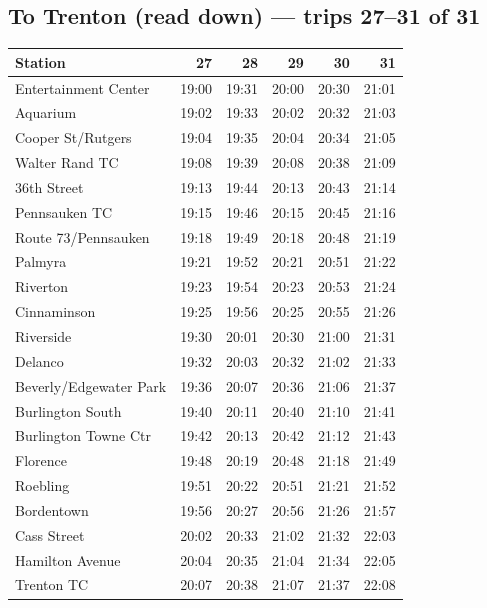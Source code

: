 \subsection*{To Trenton (read down) --- trips 27--31 of 31}
\begin{center}\footnotesize\setlength{\tabcolsep}{3pt}\begin{tabular}{@{}lrrrrr@{}}\toprule
Station & 27 & 28 & 29 & 30 & 31 \\\midrule
Entertainment Center & 19:00 & 19:31 & 20:00 & 20:30 & 21:01 \\
Aquarium & 19:02 & 19:33 & 20:02 & 20:32 & 21:03 \\
Cooper St/Rutgers & 19:04 & 19:35 & 20:04 & 20:34 & 21:05 \\
Walter Rand TC & 19:08 & 19:39 & 20:08 & 20:38 & 21:09 \\
36th Street & 19:13 & 19:44 & 20:13 & 20:43 & 21:14 \\
Pennsauken TC & 19:15 & 19:46 & 20:15 & 20:45 & 21:16 \\
Route 73/Pennsauken & 19:18 & 19:49 & 20:18 & 20:48 & 21:19 \\
Palmyra & 19:21 & 19:52 & 20:21 & 20:51 & 21:22 \\
Riverton & 19:23 & 19:54 & 20:23 & 20:53 & 21:24 \\
Cinnaminson & 19:25 & 19:56 & 20:25 & 20:55 & 21:26 \\
Riverside & 19:30 & 20:01 & 20:30 & 21:00 & 21:31 \\
Delanco & 19:32 & 20:03 & 20:32 & 21:02 & 21:33 \\
Beverly/Edgewater Park & 19:36 & 20:07 & 20:36 & 21:06 & 21:37 \\
Burlington South & 19:40 & 20:11 & 20:40 & 21:10 & 21:41 \\
Burlington Towne Ctr & 19:42 & 20:13 & 20:42 & 21:12 & 21:43 \\
Florence & 19:48 & 20:19 & 20:48 & 21:18 & 21:49 \\
Roebling & 19:51 & 20:22 & 20:51 & 21:21 & 21:52 \\
Bordentown & 19:56 & 20:27 & 20:56 & 21:26 & 21:57 \\
Cass Street & 20:02 & 20:33 & 21:02 & 21:32 & 22:03 \\
Hamilton Avenue & 20:04 & 20:35 & 21:04 & 21:34 & 22:05 \\
Trenton TC & 20:07 & 20:38 & 21:07 & 21:37 & 22:08 \\
\bottomrule\end{tabular}\end{center}
